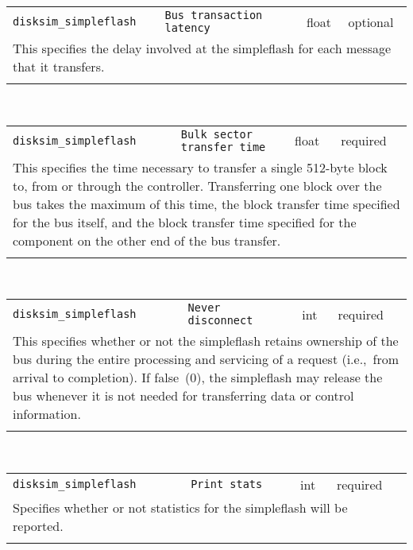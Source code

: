 \noindent 
\begin{tabular}{|p{1.5in}|p{3.5in}|p{0.5in}|p{0.5in}|}
\cline{1-4}
\texttt{disksim\_simpleflash} & \texttt{Bus transaction latency} & float & optional \\ 
\cline{1-4}
\multicolumn{4}{|p{6in}|}{
This specifies the delay involved at the simpleflash for each message that
it transfers.
}\\ 
\cline{1-4}
\multicolumn{4}{p{5in}}{}\\
\end{tabular}\\ 
\noindent 
\begin{tabular}{|p{1.5in}|p{3.5in}|p{0.5in}|p{0.5in}|}
\cline{1-4}
\texttt{disksim\_simpleflash} & \texttt{Bulk sector transfer time} & float & required \\ 
\cline{1-4}
\multicolumn{4}{|p{6in}|}{
This specifies the time necessary to transfer a single 512-byte block to,
from or through the controller. Transferring one block over the bus
takes the maximum of this time, the block transfer time specified for
the bus itself, and the block transfer time specified for the
component on the other end of the bus transfer.
}\\ 
\cline{1-4}
\multicolumn{4}{p{5in}}{}\\
\end{tabular}\\ 
\noindent 
\begin{tabular}{|p{1.5in}|p{3.5in}|p{0.5in}|p{0.5in}|}
\cline{1-4}
\texttt{disksim\_simpleflash} & \texttt{Never disconnect} & int & required \\ 
\cline{1-4}
\multicolumn{4}{|p{6in}|}{
This specifies whether or not the simpleflash retains ownership of the bus
during the entire processing and servicing of a request (i.e.,~from
arrival to completion). If false~(0), the simpleflash may release the
bus whenever it is not needed for transferring data or control
information.
}\\ 
\cline{1-4}
\multicolumn{4}{p{5in}}{}\\
\end{tabular}\\ 
\noindent 
\begin{tabular}{|p{1.5in}|p{3.5in}|p{0.5in}|p{0.5in}|}
\cline{1-4}
\texttt{disksim\_simpleflash} & \texttt{Print stats} & int & required \\ 
\cline{1-4}
\multicolumn{4}{|p{6in}|}{
Specifies whether or not statistics for the simpleflash will be reported.
}\\ 
\cline{1-4}
\multicolumn{4}{p{5in}}{}\\
\end{tabular}\\ 

